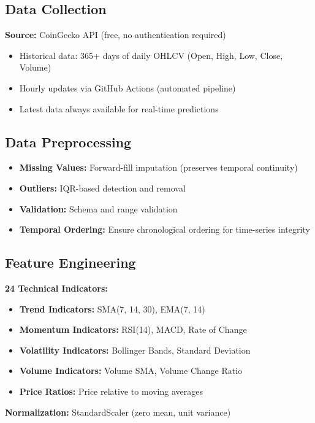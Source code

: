 \subsection{Data Collection}

\textbf{Source:} CoinGecko API (free, no authentication required)
\begin{itemize}
    \item Historical data: 365+ days of daily OHLCV (Open, High, Low, Close, Volume)
    \item Hourly updates via GitHub Actions (automated pipeline)
    \item Latest data always available for real-time predictions
\end{itemize}

\subsection{Data Preprocessing}

\begin{itemize}
    \item \textbf{Missing Values:} Forward-fill imputation (preserves temporal continuity)
    \item \textbf{Outliers:} IQR-based detection and removal
    \item \textbf{Validation:} Schema and range validation
    \item \textbf{Temporal Ordering:} Ensure chronological ordering for time-series integrity
\end{itemize}

\subsection{Feature Engineering}

\textbf{24 Technical Indicators:}
\begin{itemize}
    \item \textbf{Trend Indicators:} SMA(7, 14, 30), EMA(7, 14)
    \item \textbf{Momentum Indicators:} RSI(14), MACD, Rate of Change
    \item \textbf{Volatility Indicators:} Bollinger Bands, Standard Deviation
    \item \textbf{Volume Indicators:} Volume SMA, Volume Change Ratio
    \item \textbf{Price Ratios:} Price relative to moving averages
\end{itemize}

\textbf{Normalization:} StandardScaler (zero mean, unit variance)

